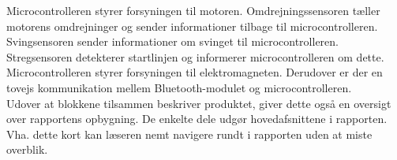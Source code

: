 Microcontrolleren styrer forsyningen til motoren. Omdrejningssensoren tæller motorens omdrejninger og sender informationer tilbage til microcontrolleren. Svingsensoren sender informationer om svinget til microcontrolleren. Stregsensoren detekterer startlinjen og informerer microcontrolleren om dette. Microcontrolleren styrer forsyningen til elektromagneten. Derudover er der en tovejs kommunikation mellem Bluetooth-modulet og microcontrolleren. \\
Udover at blokkene tilsammen beskriver produktet, giver dette også en oversigt over rapportens opbygning. De enkelte dele udgør hovedafsnittene i rapporten. Vha. dette kort kan læseren nemt navigere rundt i rapporten uden at miste overblik. 